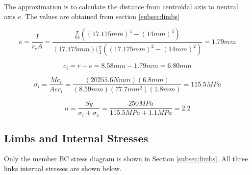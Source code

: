 The approximation is to calculate the distance from centroidal axis to neutral axis $e$. The values are obtained from section \ref{subsec:limbs}

\begin{equation}
    e = \frac{I}{r_c A} = \frac{\frac{\pi}{64}((17.175mm)^4 - (14mm)^4)}{(17.175mm)(\frac{\pi}{4}((17.175mm)^2-(14mm)^2)} = 1.79 mm
\end{equation}

\begin{equation}
    c_i = r - e = 8.58mm - 1.79mm = 6.80mm
\end{equation}

\begin{equation}
    \sigma_i = \frac{Mc_i}{Aer_i} = \frac{(20255.6Nmm)(6.8mm)}{(8.59mm)(77.7mm^2)(1.8mm)} = 115.5 MPa
\end{equation}

\begin{equation}
    n = \frac{Sy}{\sigma_i + \sigma_x} = \frac{250 MPa}{115.5 MPa + 1.1 MPa} = 2.2
\end{equation}

\subsection{Limbs and Internal Stresses}
\label{app:limb_analysis}Only the member BC stress diagram is shown in Section \ref{subsec:limbs}. All three links internal stresses are shown below.

